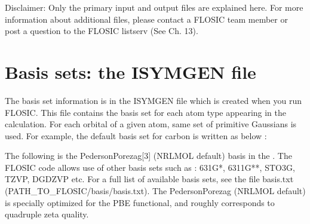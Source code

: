 \documentclass[letterpaper,10pt,english,openany,oneside]{sphinxmanual}
\begin{document}
\sphinxAtStartPar
Disclaimer: Only the primary input and output files are explained here. For more information about additional files, please contact a FLOSIC team member or post a question to the FLOSIC listserv (See Ch. 13).


\chapter{Basis sets: the ISYMGEN file}
\label{\detokenize{docs/isymgen:basis-sets-the-isymgen-file}}\label{\detokenize{docs/isymgen:usymgen}}\label{\detokenize{docs/isymgen::doc}}
\sphinxAtStartPar
The basis set information is in the ISYMGEN file which is created when you run FLOSIC.
This file contains the basis set for each atom type appearing in the calculation. For each orbital of a given atom, same set of primitive Gaussians is used. For example, the default basis set for carbon is written as below :

\sphinxAtStartPar
The following is the Pederson\sphinxhyphen{}Porezag{[}3{]} (NRLMOL default) basis in the   .  The FLOSIC code
allows use of other basis sets such as : 6\sphinxhyphen{}31G*, 6\sphinxhyphen{}311G**, STO\sphinxhyphen{}3G, TZVP, DGDZVP etc.
For a full list of available basis sets, see the file basis.txt (PATH\_TO\_FLOSIC/basis/basis.txt).
The Pederson\sphinxhyphen{}Porezag (NRLMOL default) is specially optimized for the PBE functional, and roughly corresponds to quadruple zeta quality.
\end{document}
